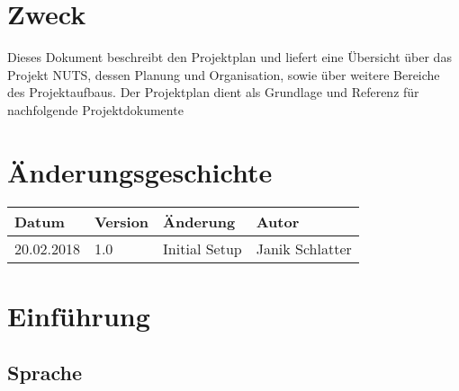 \documentclass[
	ngerman,
	toc=listof, %
	toc=bibliography, %
	footnotes=multiple, %
	parskip=half, %
	numbers=noendperiod %
]{scrartcl}
\newcommand{\vorlagenOrdner}{../../99_Vorlagen} %
\begin{document}
\thispagestyle{plain}

\cleardoublepage


\section*{Zweck}
Dieses Dokument beschreibt den Projektplan und liefert eine Übersicht über das Projekt NUTS, dessen Planung und Organisation, sowie über weitere Bereiche des Projektaufbaus. Der Projektplan dient als Grundlage und Referenz für nachfolgende Projektdokumente

\section*{Änderungsgeschichte}
\begin{tabularx}{0.9\textwidth}{llXl}
	\toprule
	Datum & Version & Änderung & Autor \\
	\midrule
	20.02.2018 & 1.0 & Initial Setup & Janik Schlatter \\
	\bottomrule
\end{tabularx}
\cleardoublepage

{}
\tableofcontents
\cleardoublepage

\let\stdsection\section
\renewcommand\section{\clearpage\stdsection}

\section{Einführung}
	\subsection{Sprache}
\end{document}
